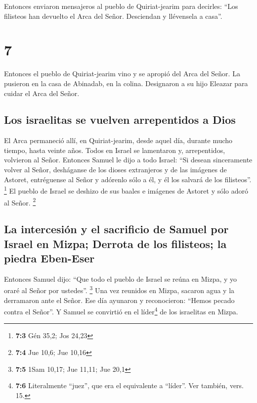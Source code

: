  Entonces enviaron mensajeros al pueblo de Quiriat-jearim
para decirles: ``Los filisteos han devuelto el Arca del Señor.
Desciendan y llévensela a casa''.

\hypertarget{section-6}{%
\section{7}\label{section-6}}

 Entonces el pueblo de Quiriat-jearim vino y se apropió
del Arca del Señor. La pusieron en la casa de Abinadab, en la colina.
Designaron a su hijo Eleazar para cuidar el Arca del Señor.

\hypertarget{los-israelitas-se-vuelven-arrepentidos-a-dios}{%
\subsection{Los israelitas se vuelven arrepentidos a
Dios}\label{los-israelitas-se-vuelven-arrepentidos-a-dios}}

 El Arca permaneció allí, en Quiriat-jearim, desde aquel
día, durante mucho tiempo, hasta veinte años. Todos en Israel se
lamentaron y, arrepentidos, volvieron al Señor.  Entonces
Samuel le dijo a todo Israel: ``Si desean sinceramente volver al Señor,
desháganse de los dioses extranjeros y de las imágenes de Astoret,
entréguense al Señor y adórenlo sólo a él, y él los salvará de los
filisteos''. \footnote{\textbf{7:3} Gén 35,2; Jos 24,23} 
El pueblo de Israel se deshizo de sus baales e imágenes de Astoret y
sólo adoró al Señor. \footnote{\textbf{7:4} Jue 10,6; Jue 10,16}

\hypertarget{la-intercesiuxf3n-y-el-sacrificio-de-samuel-por-israel-en-mizpa-derrota-de-los-filisteos-la-piedra-eben-eser}{%
\subsection{La intercesión y el sacrificio de Samuel por Israel en
Mizpa; Derrota de los filisteos; la piedra
Eben-Eser}\label{la-intercesiuxf3n-y-el-sacrificio-de-samuel-por-israel-en-mizpa-derrota-de-los-filisteos-la-piedra-eben-eser}}

 Entonces Samuel dijo: ``Que todo el pueblo de Israel se
reúna en Mizpa, y yo oraré al Señor por ustedes''. \footnote{\textbf{7:5}
  1Sam 10,17; Jue 11,11; Jue 20,1}  Una vez reunidos en
Mizpa, sacaron agua y la derramaron ante el Señor. Ese día ayunaron y
reconocieron: ``Hemos pecado contra el Señor''. Y Samuel se convirtió en
el líder\footnote{\textbf{7:6} Literalmente ``juez'', que era el
  equivalente a ``líder''. Ver también, vers. 15.} de los israelitas en
Mizpa.


